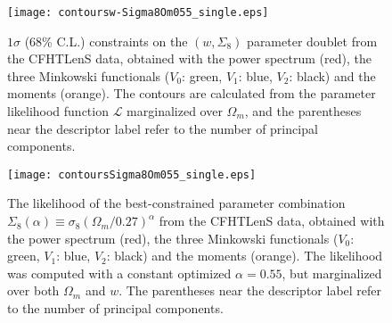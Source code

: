 \documentclass[reprint,aps,prd,superscriptaddress,showkeys,showpacs]{revtex4-1}
\begin{document}
\begin{figure}
\begin{center}
\texttt{[image: contoursw-Sigma8Om055\_single.eps]}
\end{center}
\caption{$1\sigma$ (68\% C.L.) constraints on the $(w,\Sigma_8)$
  parameter doublet from the CFHTLenS data, obtained with the power
  spectrum (red), the three Minkowski functionals ($V_0$: green,
  $V_1$: blue, $V_2$: black) and the moments (orange).
   The contours are calculated from the parameter likelihood function
   $\mathcal{L}$ marginalized over $\Omega_m$, and the parentheses
   near the descriptor label refer to the number of principal
   components.}
\label{contours3singleRep}
\end{figure}

\begin{figure}
\begin{center}
\texttt{[image: contoursSigma8Om055\_single.eps]}
\end{center}
\caption{The likelihood of the best-constrained parameter combination
  $\Sigma_8(\alpha)\equiv\sigma_8(\Omega_m/0.27)^\alpha$ from the
  CFHTLenS data, obtained with the power spectrum (red), the three
  Minkowski functionals ($V_0$: green, $V_1$: blue, $V_2$: black) and
  the moments (orange).
  The likelihood was computed with a constant optimized $\alpha=0.55$,
  but marginalized over both $\Omega_m$ and $w$. 
  The parentheses near the descriptor label refer to the number of
  principal components.}
\label{likelihoodSi8single}
\end{figure}
\end{document}
